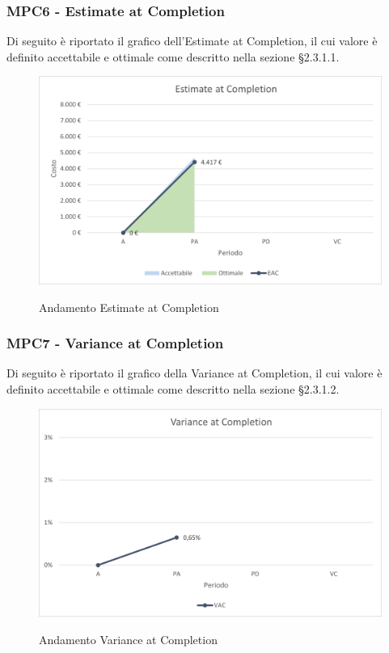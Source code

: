 \subsubsection{MPC6 - Estimate at Completion}
Di seguito è riportato il grafico dell'Estimate at Completion, il cui valore è definito accettabile e ottimale come descritto nella sezione §2.3.1.1.\\

\begin{figure}[H]
\centering
\includegraphics[scale=0.78]{res/ResocontoAttivitaDiVerifica/res/metriche/grafici/img/estimateCompletion.png}\\
\caption{Andamento Estimate at Completion}
\end{figure}

\subsubsection{MPC7 - Variance at Completion}
Di seguito è riportato il grafico della Variance at Completion, il cui valore è definito accettabile e ottimale come descritto nella sezione §2.3.1.2.\\

\begin{figure}[H]
\centering
\includegraphics[scale=0.78]{res/ResocontoAttivitaDiVerifica/res/metriche/grafici/img/varianceCompletion.png}\\
\caption{Andamento Variance at Completion}
\end{figure}

